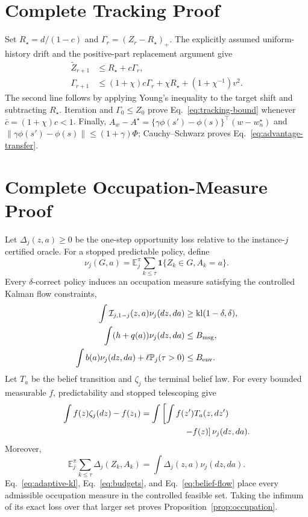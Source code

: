 \documentclass[journal]{IEEEtran}
\newcommand{\E}{\mathbb E}
\newcommand{\Pp}{\mathbb P}
\begin{document}
\section{Complete Tracking Proof}
Set $R_\star=d/(1-c)$ and $\Gamma_r=(Z_r-R_\star)_+$.
The explicitly assumed uniform-history drift and the positive-part replacement argument give
\begin{align}
\widetilde Z_{r+1}
&\le R_\star+c\Gamma_r,\nonumber\\
\Gamma_{r+1}
&\le(1+\chi)c\Gamma_r+\chi R_\star+(1+\chi^{-1})v^2.
\label{eq:tracking-old-target}
\end{align}
The second line follows by applying Young's inequality to the target shift and subtracting $R_\star$.
Iteration and $\Gamma_0\le Z_0$ prove Eq.~\eqref{eq:tracking-bound} whenever $\bar c=(1+\chi)c<1$.
Finally, $\widehat A_w-A^\star=\{\gamma\phi(s')-\phi(s)\}^\top(w-w_n^\star)$ and $\|\gamma\phi(s')-\phi(s)\|\le(1+\gamma)\Phi$; Cauchy--Schwarz proves Eq.~\eqref{eq:advantage-transfer}.

\section{Complete Occupation-Measure Proof}
Let $\Delta_j(z,a)\ge0$ be the one-step opportunity loss relative to the instance-$j$ certified oracle.
For a stopped predictable policy, define
\begin{equation}
\nu_j(G,a)=\E_j^\pi\sum_{k\le\tau}\mathbf{1}\{Z_k\in G,A_k=a\}.
\end{equation}
Every $\delta$-correct policy induces an occupation measure satisfying the controlled Kalman flow constraints,
\begin{align}
\int\mathcal{I}_{j,1-j}(z,a)\nu_j(dz,da)&\ge\operatorname{kl}(1-\delta,\delta),\nonumber\\
\int(h+q(a))\nu_j(dz,da)&\le B_{\rm msg},\nonumber\\
\int b(a)\nu_j(dz,da)+\ell\Pp_j(\tau>0)&\le B_{\rm env}.
\end{align}
Let $T_a$ be the belief transition and $\zeta_j$ the terminal belief law.
For every bounded measurable $f$, predictability and stopped telescoping give
\begin{align}
\int f(z)\zeta_j(dz)-f(z_1)
&=\int\left[\int f(z')T_a(z,dz')\right.\nonumber\\
&\left.\hspace{18mm}-f(z)\right]\nu_j(dz,da).
\label{eq:belief-flow}
\end{align}
Moreover,
\begin{equation}
\E_j^\pi\sum_{k\le\tau}\Delta_j(Z_k,A_k)
=\int\Delta_j(z,a)\nu_j(dz,da).
\end{equation}
Eq.~\eqref{eq:adaptive-kl}, Eq.~\eqref{eq:budgets}, and Eq.~\eqref{eq:belief-flow} place every admissible occupation measure in the controlled feasible set.
Taking the infimum of its exact loss over that larger set proves Proposition~\ref{prop:occupation}.

\end{document}
